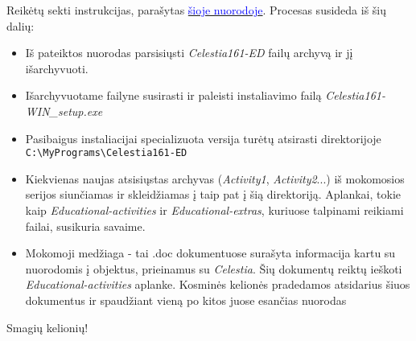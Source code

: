 \documentclass[a4paper]{article}
\newcommand{\goto}[2]{\href{\detokenize{#1}}{\textcolor{blue}{#2}}}
\begin{document}
Reikėtų sekti instrukcijas, parašytas \goto{http://www.celestiamotherlode.net/catalog/educational.php}{šioje nuorodoje}. Procesas susideda iš šių dalių:
\begin{itemize}
\item Iš pateiktos nuorodas parsisiųsti \textit{Celestia161-ED} failų archyvą ir jį išarchyvuoti.
\item Išarchyvuotame failyne susirasti ir paleisti instaliavimo failą \textit{Celestia161-WIN\_setup.exe}
\item Pasibaigus instaliacijai specializuota versija turėtų atsirasti direktorijoje \verb|C:\MyPrograms\Celestia161-ED|
\item Kiekvienas naujas atsisiųstas archyvas (\textit{Activity1}, \textit{Activity2}...) iš mokomosios serijos siunčiamas ir skleidžiamas į taip pat į šią direktoriją. Aplankai, tokie kaip \textit{Educational-activities} ir \textit{Educational-extras}, kuriuose talpinami reikiami failai, susikuria savaime.
\item Mokomoji medžiaga - tai .doc dokumentuose surašyta informacija kartu su nuorodomis į objektus, prieinamus su \textit{Celestia}. Šių dokumentų reiktų ieškoti \textit{Educational-activities} aplanke. Kosminės kelionės pradedamos atsidarius šiuos dokumentus ir spaudžiant vieną po kitos juose esančias nuorodas
\end{itemize}
Smagių kelionių!
\end{document}
